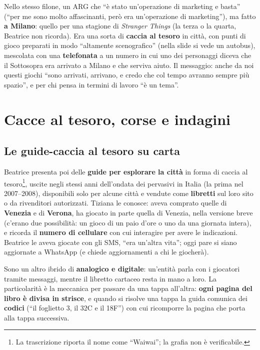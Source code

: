 Nello stesso filone, un ARG che ``è stato un'operazione di marketing e basta''
(``per me sono molto affascinanti, però era un'operazione di marketing''), ma
fatto \textbf{a Milano}: quello per una stagione di \emph{Stranger Things} (la
terza o la quarta, Beatrice non ricorda). Era una sorta di \textbf{caccia al
tesoro} in città, con punti di gioco preparati in modo ``altamente scenografico''
(nella slide si vede un autobus), mescolata con una \textbf{telefonata} a un
numero in cui uno dei personaggi diceva che il Sottosopra era arrivato a Milano e
che serviva aiuto. Il messaggio: anche da noi questi giochi ``sono arrivati,
arrivano, e credo che col tempo avranno sempre più spazio'', e per chi pensa in
termini di lavoro ``è un tema''.

\section{Cacce al tesoro, corse e indagini}
\label{a2:sec:pervasivi-cacce}

\subsection{Le guide-caccia al tesoro su carta}

Beatrice presenta poi delle \textbf{guide per esplorare la città} in forma di
caccia al tesoro\footnote{La trascrizione riporta il nome come ``Waiwai''; la
grafia non è verificabile.}, uscite negli stessi anni dell'ondata dei pervasivi
in Italia (la prima nel 2007--2008), disponibili solo per alcune città e
vendute come \textbf{libretti} sul loro sito o da rivenditori autorizzati.
Tiziana le conosce: aveva comprato quelle di \textbf{Venezia} e di
\textbf{Verona}, ha giocato in parte quella di Venezia, nella versione breve
(c'erano due possibilità: un gioco di un paio d'ore o uno da una giornata
intera), e ricorda il \textbf{numero di cellulare} con cui interagire per avere
le indicazioni. Beatrice le aveva giocate con gli SMS, ``era un'altra vita'';
oggi pare si siano aggiornate a WhatsApp (e chiede aggiornamenti a chi le
giocherà).

Sono un altro ibrido di \textbf{analogico e digitale}: un'entità parla con i
giocatori tramite messaggi, mentre il libretto cartaceo resta in mano a loro. La
particolarità è la meccanica per passare da una tappa all'altra: \textbf{ogni
pagina del libro è divisa in strisce}, e quando si risolve una tappa la guida
comunica dei \textbf{codici} (``il foglietto 3, il 32C e il 18F'') con cui
ricomporre la pagina che porta alla tappa successiva.

